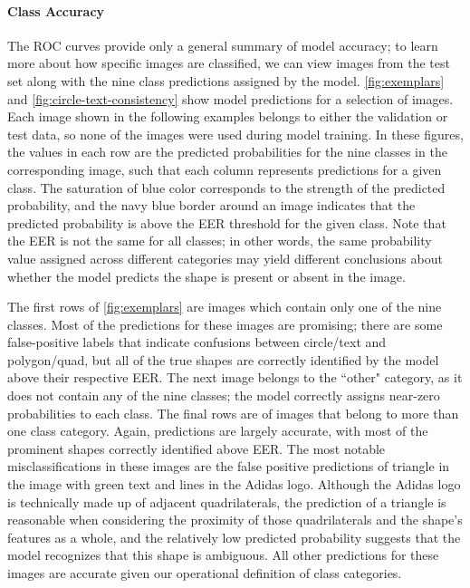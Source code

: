 \documentclass{article}\usepackage[]{graphicx}\usepackage[table]{xcolor}
\begin{document}
\paragraph{Class Accuracy}
The ROC curves provide only a general summary of model accuracy; to learn more about how specific images are classified, we can view images from the test set along with the nine class predictions assigned by the model. \autoref{fig:exemplars} and \autoref{fig:circle-text-consistency} show model predictions for a selection of images. Each image shown in the following examples belongs to either the validation or test data, so none of the images were used during model training. In these figures, the values in each row are the predicted probabilities for the nine classes in the corresponding image, such that each column represents predictions for a given class. The saturation of blue color corresponds to the strength of the predicted probability, and the navy blue border around an image indicates that the predicted probability is above the EER threshold for the given class. Note that the EER is not the same for all classes; in other words, the same probability value assigned across different categories may yield different conclusions about whether the model predicts the shape is present or absent in the image.

The first rows of \autoref{fig:exemplars} are images which contain only one of the nine classes. Most of the predictions for these images are promising; there are some false-positive labels that indicate confusions between circle/text and polygon/quad, but all of the true shapes are correctly identified by the model above their respective EER. The next image belongs to the ``other" category, as it does not contain any of the nine classes; the model correctly assigns near-zero probabilities to each class. The final rows are of images that belong to more than one class category. Again, predictions are largely accurate, with most of the prominent shapes correctly identified above EER. The most notable misclassifications in these images are the false positive predictions of triangle in the image with green text and lines in the Adidas logo. Although the Adidas logo is technically made up of adjacent quadrilaterals, the prediction of a triangle is reasonable when considering the proximity of those quadrilaterals and the shape's features as a whole, and the relatively low predicted probability suggests that the model recognizes that this shape is ambiguous. All other predictions for these images are accurate given our operational definition of class categories.
\end{document}
